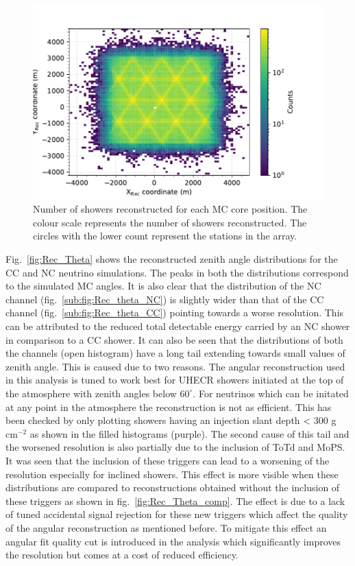 \begin{figure}[h!]
  \centering
  \includegraphics[width=14.5cm]{thesis_figures/Nu_analysis/MC_control/Core_position_Profile_Rec_wnt_redcut.pdf}
  \caption{Number of showers reconstructed for each MC core position. The colour scale represents the number of showers reconstructed. The circles with the lower count represent the stations in the array.}
  \label{fig:Core_XY_rec}
\end{figure}
Fig.~\ref{fig:Rec_Theta} shows the reconstructed zenith angle distributions for the CC and NC neutrino simulations. The peaks in both the distributions correspond to the simulated MC angles. It is also clear that the distribution of the NC channel (fig.~\ref{sub:fig:Rec_theta_NC}) is slightly wider than that of the CC channel (fig.~\ref{sub:fig:Rec_theta_CC}) pointing towards a worse resolution. This can be attributed to the reduced total detectable energy carried by an NC shower in comparison to a CC shower. It can also be seen that the distributions of both the channels (open histogram) have a long tail extending towards small values of zenith angle. This is caused due to two reasons. The angular reconstruction used in this analysis is tuned to work best for UHECR showers initiated at the top of the atmosphere with zenith angles below $60^{\circ}$. For neutrinos which can be initated at any point in the atmosphere the reconstruction is not as efficient. This has been checked by only plotting showers having an injection slant depth < 300 g cm$^{-2}$ as shown in the filled histograms (purple). The second cause of this tail and the worsened resolution is also partially due to the inclusion of ToTd and MoPS. It was seen that the inclusion of these triggers can lead to a worsening of the resolution especially for inclined showers. This effect is more visible when these distributions are compared to reconstructions obtained without the inclusion of these triggers as shown in fig.~\ref{fig:Rec_Theta_comp}. The effect is due to a lack of tuned accidental signal rejection for these new triggers which affect the quality of the angular reconstruction as mentioned before. To mitigate this effect an angular fit quality cut is introduced in the analysis which significantly improves the resolution but comes at a cost of reduced efficiency.

